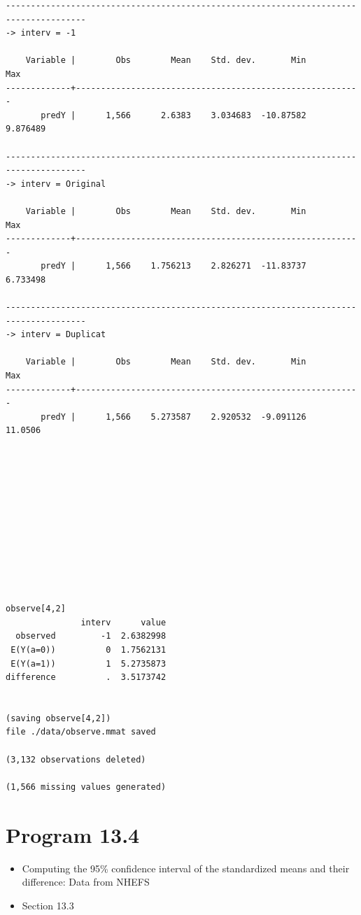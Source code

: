 \documentclass[
  10pt,
  a4paper,
]{book}
\providecommand{\tightlist}{%
  \setlength{\itemsep}{0pt}\setlength{\parskip}{0pt}}
\begin{document}
\begin{verbatim}
--------------------------------------------------------------------------------------
-> interv = -1

    Variable |        Obs        Mean    Std. dev.       Min        Max
-------------+---------------------------------------------------------
       predY |      1,566      2.6383    3.034683  -10.87582   9.876489

--------------------------------------------------------------------------------------
-> interv = Original

    Variable |        Obs        Mean    Std. dev.       Min        Max
-------------+---------------------------------------------------------
       predY |      1,566    1.756213    2.826271  -11.83737   6.733498

--------------------------------------------------------------------------------------
-> interv = Duplicat

    Variable |        Obs        Mean    Std. dev.       Min        Max
-------------+---------------------------------------------------------
       predY |      1,566    5.273587    2.920532  -9.091126    11.0506












observe[4,2]
               interv      value
  observed         -1  2.6382998
 E(Y(a=0))          0  1.7562131
 E(Y(a=1))          1  5.2735873
difference          .  3.5173742


(saving observe[4,2])
file ./data/observe.mmat saved

(3,132 observations deleted)

(1,566 missing values generated)
\end{verbatim}

\hypertarget{program-13.4-1}{%
\section{Program 13.4}\label{program-13.4-1}}

\begin{itemize}
\tightlist
\item
  Computing the 95\% confidence interval of the standardized means and their difference: Data from NHEFS
\item
  Section 13.3
\end{itemize}
\end{document}
